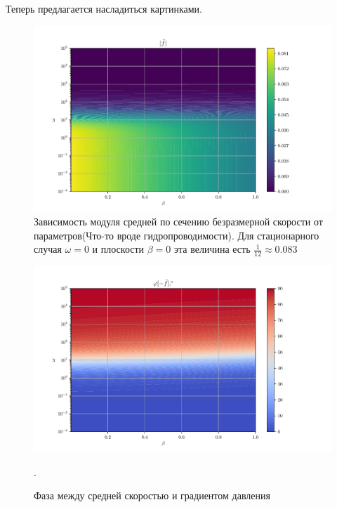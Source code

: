 \documentclass[a4paper,12pt]{article}
\theoremstyle{plain} %
\theoremstyle{definition} %
\theoremstyle{remark} %
\begin{document}
Теперь предлагается насладиться картинками.
\newpage
\begin{figure}[H]
\begin{center}
\includegraphics[scale=0.8]{Abs pic conduct.pdf}
\caption{Зависимость модуля средней по сечению безразмерной скорости от параметров(Что-то вроде гидропроводимости). Для стационарного случая $\omega=0$ и плоскости $\beta=0$ эта величина есть $\frac{1}{12}\approx 0.083$} %
\label{ris:experimoriginal} %
\end{center}
\end{figure}

\begin{figure}[H]
\begin{center}
\includegraphics[scale=0.8]{Phase pic conduct.pdf}
\caption{Фаза между средней скоростью и градиентом давления}.
\label{fig:conduct}
\end{center}
\end{figure}
\end{document}

